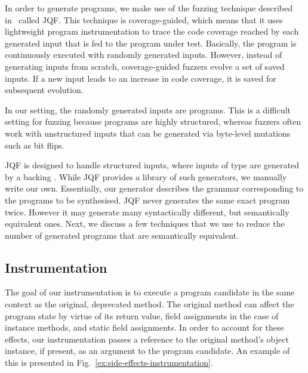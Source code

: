 \documentclass[runningheads,a4paper]{llncs}
\begin{document}
In order to generate programs, we make use of the fuzzing technique described
in~\cite{DBLP:conf/issta/PadhyeLS19} called JQF.  This technique is
coverage-guided, which means that it uses lightweight program
instrumentation to trace the code coverage reached by each generated
input that is fed to the program under test.  Basically, the program
is continuously executed with randomly generated inputs. However,
instead of generating inputs from scratch, coverage-guided fuzzers
evolve a set of saved inputs. If a new input leads to an increase
in code coverage, it is saved for subsequent evolution.

In our setting, the randomly generated inputs are programs.
This is a difficult setting for fuzzing because programs are
highly structured, whereas fuzzers often work with unstructured inputs
that can be generated via byte-level mutations such as bit flips.

JQF is designed to handle structured inputs, where inputs of type 
are generated by a backing .
While JQF provides a library of such generators, we manually write our own.
Essentially, our generator describes the grammar corresponding to the
programs to be synthesised.
JQF never generates the same exact program twice. However it may generate many
syntactically different, but semantically equivalent ones.
Next, we discuss a few techniques that we use to reduce the number of
generated programs that are semantically equivalent.


\subsection{Instrumentation}

The goal of our instrumentation is to execute a program candidate in
the same context as the original, deprecated method. The original
method can affect the program state by virtue of its return value,
field assignments in the case of instance methods, and static field
assignments. In order to account for these effects, our
instrumentation passes a reference to the original method's object
instance, if present, as an argument to the program candidate.
An example of this is presented in
Fig.~\ref{ex:side-effects-instrumentation}.
\end{document}
